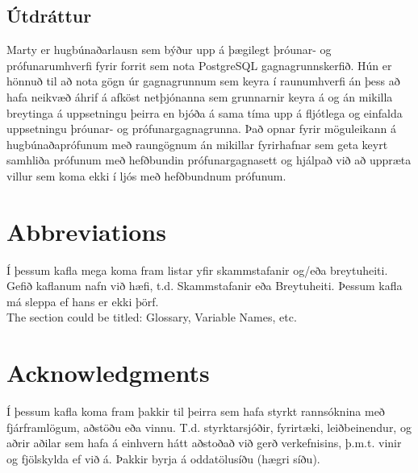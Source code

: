 \documentclass[a4paper,12pt,twoside,BCOR=10mm]{scrbook}
\begin{document}
\section*{\huge Útdráttur}
Marty er hugbúnaðarlausn sem býður upp á þægilegt þróunar- og prófunarumhverfi fyrir forrit sem nota PostgreSQL gagnagrunnskerfið. Hún er hönnuð til að nota gögn úr gagnagrunnum sem keyra í raunumhverfi án þess að hafa neikvæð áhrif á afköst netþjónanna sem grunnarnir keyra á og án mikilla breytinga á uppsetningu þeirra en bjóða á sama tíma upp á fljótlega og einfalda uppsetningu þróunar- og prófunargagnagrunna. Það opnar fyrir möguleikann á hugbúnaðaprófunum með raungögnum án mikillar fyrirhafnar sem geta keyrt samhliða prófunum með hefðbundin prófunargagnasett og hjálpað við að uppræta villur sem koma ekki í ljós með hefðbundnum prófunum.
\vfill
\newpage

\tableofcontents
\listoffigures
\listoftables

\chapter*{Abbreviations}
Í þessum kafla mega koma fram listar yfir skammstafanir og/eða breytuheiti. Gefið kaflanum nafn við hæfi, t.d. Skammstafanir eða Breytuheiti. Þessum kafla má sleppa ef hans er ekki þörf. \\

The section could be titled: Glossary, Variable Names, etc.

\chapter*{Acknowledgments}
Í þessum kafla koma fram þakkir til þeirra sem hafa styrkt rannsóknina með fjárframlögum, aðstöðu eða vinnu. T.d. styrktarsjóðir, fyrirtæki, leiðbeinendur, og aðrir aðilar sem hafa á einhvern hátt aðstoðað við gerð verkefnisins, þ.m.t. vinir og fjölskylda ef við á. Þakkir byrja á oddatölusíðu (hægri síðu).
\end{document}
